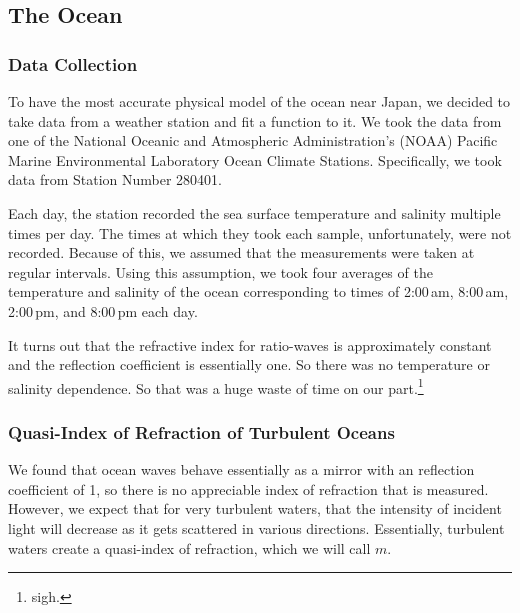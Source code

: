 \documentclass[11pt]{article}
\numberwithin{equation}{section}
\begin{document}

\subsection{The Ocean} %
\label{sub:the_ocean}

\subsubsection{Data Collection} %
\label{ssub:data_collection}

To have the most accurate physical model of the ocean near Japan, we decided to take data from a weather station and fit a function to it. We took the data from one of the National Oceanic and Atmospheric Administration's (NOAA) Pacific Marine Environmental Laboratory Ocean Climate Stations. Specifically, we took data from Station Number 280401. 

Each day, the station recorded the sea surface temperature and salinity multiple times per day. The times at which they took each sample, unfortunately, were not recorded. Because of this, we assumed that the measurements were taken at regular intervals. Using this assumption, we took four averages of the temperature and salinity of the ocean corresponding to times of 2:00\,am, 8:00\,am, 2:00\,pm, and 8:00\,pm each day. 
 
It turns out that the refractive index for ratio-waves is approximately constant and the reflection coefficient is essentially one.\cite{seawater_index} So there was no temperature or salinity dependence. So that was a huge waste of time on our part.\footnote{sigh.} 


\subsubsection{Quasi-Index of Refraction of Turbulent Oceans} %
\label{ssub:ocean_ind_of_ref}
We found that ocean waves behave essentially as a mirror with an reflection coefficient of 1, so there is no appreciable index of refraction that is measured.\cite{seawater_index} However, we expect that for very turbulent waters, that the intensity of incident light will decrease as it gets scattered in various directions. Essentially, turbulent waters create a quasi-index of refraction, which we will call $m.$
\end{document}
